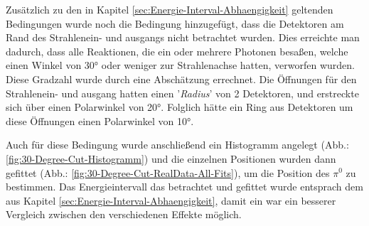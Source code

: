 \documentclass[a4paper,11pt,oneside,final,german,openbib,pdftex]{scrbook}
\begin{document}
{%


Zus\"atzlich zu den in Kapitel \ref{sec:Energie-Interval-Abhaengigkeit} geltenden Bedingungen wurde noch die Bedingung hinzugef\"ugt, dass die Detektoren am Rand des Strahlenein- und ausgangs nicht betrachtet wurden. Dies erreichte man dadurch, dass alle Reaktionen, die ein oder mehrere Photonen besa{\ss}en, welche einen Winkel von 30° oder weniger zur Strahlenachse hatten, verworfen wurden. Diese Gradzahl wurde durch eine Absch\"atzung errechnet. Die \"Offnungen f\"ur den Strahlenein- und ausgang hatten einen '\textit{Radius}' von 2 Detektoren, und erstreckte sich \"uber einen Polarwinkel von 20°. Folglich h\"atte ein Ring aus Detektoren um diese \"Offnungen einen Polarwinkel von 10°. 
 
Auch f\"ur diese Bedingung wurde anschlie{\ss}end ein Histogramm angelegt (Abb.: \ref{fig:30-Degree-Cut-Histogramm}) und die einzelnen Positionen wurden dann gefittet (Abb.: \ref{fig:30-Degree-Cut-RealData-All-Fits}), um die Position des $\pi^0$ zu bestimmen. Das Energieintervall das betrachtet und gefittet wurde entsprach dem aus Kapitel \ref{sec:Energie-Interval-Abhaengigkeit}, damit ein war ein besserer Vergleich zwischen den verschiedenen Effekte m\"oglich.

}
\end{document}
